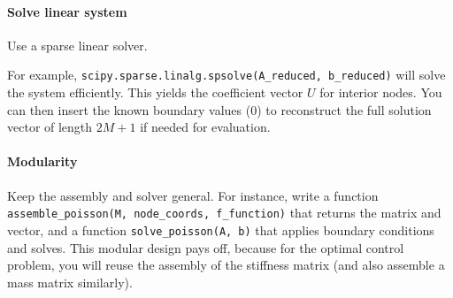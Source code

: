 \documentclass{article}
\begin{document}
\paragraph{Solve linear system}
Use a sparse linear solver. 

For example, \texttt{scipy.sparse.linalg.spsolve(A_reduced, b_reduced)} will solve the system efficiently.
This yields the coefficient vector \(U\) for interior nodes.
You can then insert the known boundary values (0) to reconstruct the full solution vector of length \(2M+1\) if needed for evaluation.

\paragraph{Modularity}
Keep the assembly and solver general. For instance, write a function \texttt{assemble_poisson(M, node_coords, f_function)} that returns the matrix and vector, and a function \texttt{solve_poisson(A, b)} that applies boundary conditions and solves.
This modular design pays off, because for the optimal control problem, you will reuse the assembly of the stiffness matrix (and also assemble a mass matrix similarly).
\end{document}
